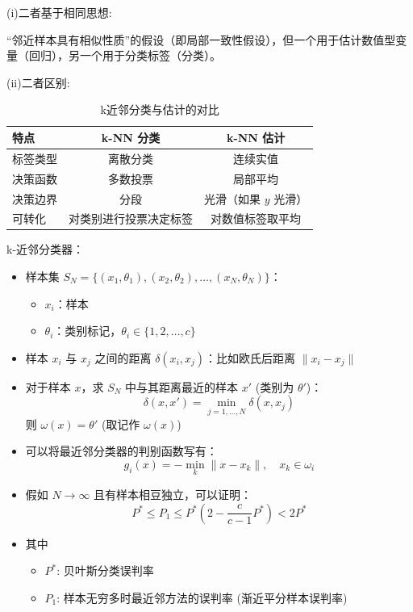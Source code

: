 \documentclass{article}
\begin{document}
(i)二者基于相同思想:

“邻近样本具有相似性质”的假设（即局部一致性假设），但一个用于估计数值型变量（回归），另一个用于分类标签（分类）。

(ii)二者区别:
\begin{table}[ht]
  \centering
  \begin{tabular}{|l|c|c|}
  \hline
  \textbf{特点} & \textbf{k-NN 分类} & \textbf{k-NN 估计} \\
  \hline
  标签类型 & 离散分类 & 连续实值 \\
  \hline
  决策函数 & 多数投票 & 局部平均 \\
  \hline
  决策边界 & 分段 & 光滑（如果 \( y \) 光滑） \\
  \hline
  可转化 & 对类别进行投票决定标签 & 对数值标签取平均 \\
  \hline
  \end{tabular}
  \caption{k近邻分类与估计的对比}
\end{table}

k-近邻分类器：
\begin{itemize}
    \item 样本集 \( S_N = \{(x_1, \theta_1), (x_2, \theta_2), \dots, (x_N, \theta_N)\} \)：
    \begin{itemize}
        \item \( x_i \)：样本
        \item \( \theta_i \)：类别标记，\( \theta_i \in \{1, 2, \dots, c\} \)
    \end{itemize}
    \item 样本 \( x_i \) 与 \( x_j \) 之间的距离 \( \delta(x_i, x_j) \)：比如欧氏后距离 \( \|x_i - x_j\| \)
    \item 对于样本 \( x \)，求 \( S_N \) 中与其距离最近的样本 \( x' \) (类别为 \( \theta' \))：
    \[
    \delta(x, x') = \min_{j=1,\dots,N} \delta(x, x_j)
    \]
    则 \( \omega(x) = \theta' \) (取记作 \( \omega(x) \))

    \item 可以将最近邻分类器的判别函数写有：
    \[
    g_i(x) = -\min_k \|x - x_k\|, \quad x_k \in \omega_i
    \]
\end{itemize}

\begin{itemize}
  \item 假如 \( N \to \infty \) 且有样本相豆独立，可以证明：
  \[
  P^* \leq P_1 \leq P^* \left(2 - \frac{c}{c-1} P^*\right) < 2P^*
  \]
  \item 其中
  \begin{itemize}
      \item \( P^* \): 贝叶斯分类误判率
      \item \( P_1 \): 样本无穷多时最近邻方法的误判率 (渐近平分样本误判率)
  \end{itemize}
\end{itemize}
\end{document}
